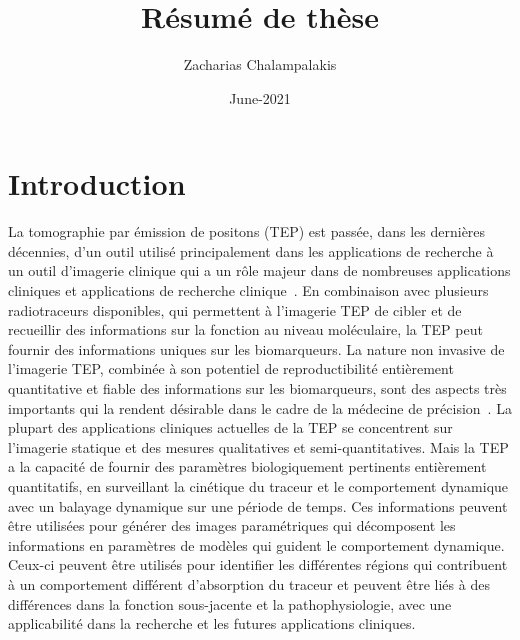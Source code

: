 \documentclass[a4paper]{article}
\title{Résumé de thèse}
\author{Zacharias Chalampalakis}
\date{June-2021}
\begin{document}
\maketitle
\section*{Introduction}
La tomographie par émission de positons (TEP) est passée, dans les dernières décennies, d'un outil utilisé principalement dans les applications de recherche à un outil d'imagerie clinique qui a un rôle majeur dans de nombreuses applications cliniques et applications de recherche clinique~\cite{Meikle2021}. 
En combinaison avec plusieurs radiotraceurs disponibles, qui permettent à l'imagerie TEP de cibler et de recueillir des informations sur la fonction au niveau moléculaire, la TEP peut fournir des informations uniques sur les biomarqueurs. La nature non invasive de l'imagerie TEP, combinée à son potentiel de reproductibilité entièrement quantitative et fiable des informations sur les biomarqueurs, sont des aspects très importants qui la rendent désirable dans le cadre de la médecine de précision~\cite{Subramaniam2017,Meikle2021}.
La plupart des applications cliniques actuelles de la TEP se concentrent sur l'imagerie statique et des mesures qualitatives et semi-quantitatives. Mais la TEP a la capacité de fournir des paramètres biologiquement pertinents entièrement quantitatifs, en surveillant la cinétique du traceur et le comportement dynamique avec un balayage dynamique sur une période de temps. Ces informations peuvent être utilisées pour générer des images paramétriques qui décomposent les informations en paramètres de modèles qui guident le comportement dynamique. Ceux-ci peuvent être utilisés pour identifier les différentes régions qui contribuent à un comportement différent d'absorption du traceur et peuvent être liés à des différences dans la fonction sous-jacente et la pathophysiologie, avec une applicabilité dans la recherche et les futures applications cliniques.
\end{document}

